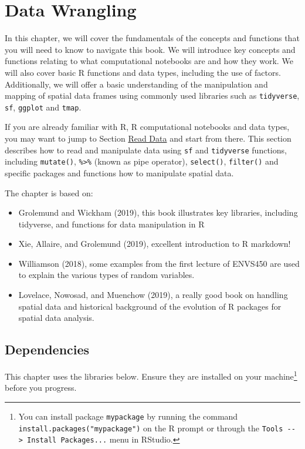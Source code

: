 \documentclass[
  letterpaper,
  DIV=11,
  numbers=noendperiod,
  oneside]{scrreprt}
\begin{document}
\chapter{Data Wrangling}\label{sec-chp3}

In this chapter, we will cover the fundamentals of the concepts and
functions that you will need to know to navigate this book. We will
introduce key concepts and functions relating to what computational
notebooks are and how they work. We will also cover basic R functions
and data types, including the use of factors. Additionally, we will
offer a basic understanding of the manipulation and mapping of spatial
data frames using commonly used libraries such as \texttt{tidyverse},
\texttt{sf}, \texttt{ggplot} and \texttt{tmap}.

If you are already familiar with R, R computational notebooks and data
types, you may want to jump to Section \hyperref[sec_readdata]{Read
Data} and start from there. This section describes how to read and
manipulate data using \texttt{sf} and \texttt{tidyverse} functions,
including \texttt{mutate()}, \texttt{\%\textgreater{}\%} (known as pipe
operator), \texttt{select()}, \texttt{filter()} and specific packages
and functions how to manipulate spatial data.

The chapter is based on:

\begin{itemize}
\item
  Grolemund and Wickham (2019), this book illustrates key libraries,
  including tidyverse, and functions for data manipulation in R
\item
  Xie, Allaire, and Grolemund (2019), excellent introduction to R
  markdown!
\item
  Williamson (2018), some examples from the first lecture of ENVS450 are
  used to explain the various types of random variables.
\item
  Lovelace, Nowosad, and Muenchow (2019), a really good book on handling
  spatial data and historical background of the evolution of R packages
  for spatial data analysis.
\end{itemize}

\section{Dependencies}\label{dependencies}

This chapter uses the libraries below. Ensure they are installed on your
machine\footnote{You can install package \texttt{mypackage} by running
  the command \texttt{install.packages("mypackage")} on the R prompt or
  through the \texttt{Tools\ -\/-\textgreater{}\ Install\ Packages...}
  menu in RStudio.} before you progress.
\end{document}
